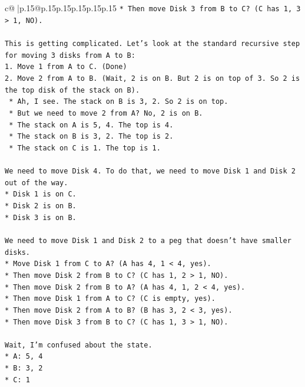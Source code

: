 \documentclass{article}
\begin{document}
{\begin{supertabular}{c@{$\;$}|p{.15\linewidth}@{}p{.15\linewidth}p{.15\linewidth}p{.15\linewidth}p{.15\linewidth}p{.15\linewidth}}
{{{\texttt{*   Then move Disk 3 from B to C? (C has 1, 3 > 1, NO).} \\
\\ 
\texttt{This is getting complicated. Let's look at the standard recursive step for moving 3 disks from A to B:} \\
\texttt{1. Move 1 from A to C. (Done)} \\
\texttt{2. Move 2 from A to B. (Wait, 2 is on B. But 2 is on top of 3. So 2 is the top disk of the stack on B).} \\
\texttt{   *   Ah, I see. The stack on B is 3, 2. So 2 is on top.} \\
\texttt{   *   But we need to move 2 from A? No, 2 is on B.} \\
\texttt{   *   The stack on A is 5, 4. The top is 4.} \\
\texttt{   *   The stack on B is 3, 2. The top is 2.} \\
\texttt{   *   The stack on C is 1. The top is 1.} \\
\\ 
\texttt{We need to move Disk 4. To do that, we need to move Disk 1 and Disk 2 out of the way.} \\
\texttt{*   Disk 1 is on C.} \\
\texttt{*   Disk 2 is on B.} \\
\texttt{*   Disk 3 is on B.} \\
\\ 
\texttt{We need to move Disk 1 and Disk 2 to a peg that doesn't have smaller disks.} \\
\texttt{*   Move Disk 1 from C to A? (A has 4, 1 < 4, yes).} \\
\texttt{*   Then move Disk 2 from B to C? (C has 1, 2 > 1, NO).} \\
\texttt{*   Then move Disk 2 from B to A? (A has 4, 1, 2 < 4, yes).} \\
\texttt{*   Then move Disk 1 from A to C? (C is empty, yes).} \\
\texttt{*   Then move Disk 2 from A to B? (B has 3, 2 < 3, yes).} \\
\texttt{*   Then move Disk 3 from B to C? (C has 1, 3 > 1, NO).} \\
\\ 
\texttt{Wait, I'm confused about the state.} \\
\texttt{*   A: 5, 4} \\
\texttt{*   B: 3, 2} \\
\texttt{*   C: 1} \\
\\ 
}}}
\end{supertabular}}
\end{document}
